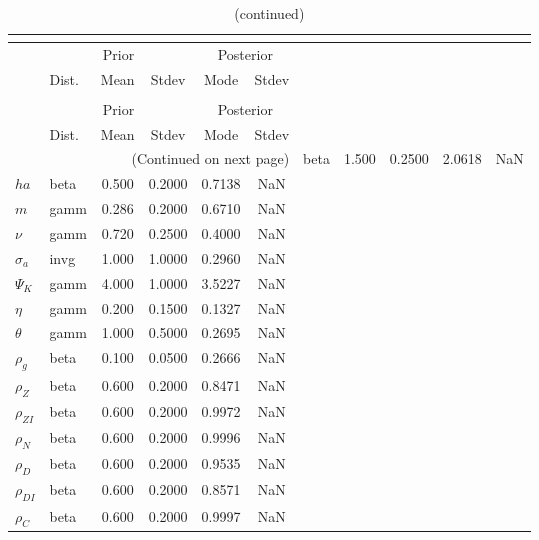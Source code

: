  
\begin{center}
\begin{longtable}{llcccc} 
\caption{Results from posterior maximization (parameters)}\\
 \label{Table:Posterior:1}\\
\toprule 
  & \multicolumn{3}{c}{Prior}  &  \multicolumn{2}{c}{Posterior} \\
  \cmidrule(r{.75em}){2-4} \cmidrule(r{.75em}){5-6}
  & Dist. & Mean  & Stdev & Mode & Stdev \\ 
\midrule \endfirsthead 
\caption{(continued)}\\
 \bottomrule 
  & \multicolumn{3}{c}{Prior}  &  \multicolumn{2}{c}{Posterior} \\
  \cmidrule(r{.75em}){2-4} \cmidrule(r{.75em}){5-6}
  & Dist. & Mean  & Stdev & Mode & Stdev \\ 
\midrule \endhead 
\bottomrule \multicolumn{6}{r}{(Continued on next page)}\endfoot 
\bottomrule\endlastfoot 
${\gamma}$ & beta &   1.500 & 0.2500 &   2.0618 &     NaN \\ 
${ha}$ & beta &   0.500 & 0.2000 &   0.7138 &     NaN \\ 
${m}$ & gamm &   0.286 & 0.2000 &   0.6710 &     NaN \\ 
$\nu$ & gamm &   0.720 & 0.2500 &   0.4000 &     NaN \\ 
${\sigma_a}$ & invg &   1.000 & 1.0000 &   0.2960 &     NaN \\ 
${\Psi_K}$ & gamm &   4.000 & 1.0000 &   3.5227 &     NaN \\ 
${\eta}$ & gamm &   0.200 & 0.1500 &   0.1327 &     NaN \\ 
${\theta}$ & gamm &   1.000 & 0.5000 &   0.2695 &     NaN \\ 
${\rho_g}$ & beta &   0.100 & 0.0500 &   0.2666 &     NaN \\ 
${\rho_Z}$ & beta &   0.600 & 0.2000 &   0.8471 &     NaN \\ 
${\rho_{ZI}}$ & beta &   0.600 & 0.2000 &   0.9972 &     NaN \\ 
${\rho_N}$ & beta &   0.600 & 0.2000 &   0.9996 &     NaN \\ 
${\rho_D}$ & beta &   0.600 & 0.2000 &   0.9535 &     NaN \\ 
${\rho_{DI}}$ & beta &   0.600 & 0.2000 &   0.8571 &     NaN \\ 
${\rho_C}$ & beta &   0.600 & 0.2000 &   0.9997 &     NaN \\ 
\end{longtable}
 \end{center}
